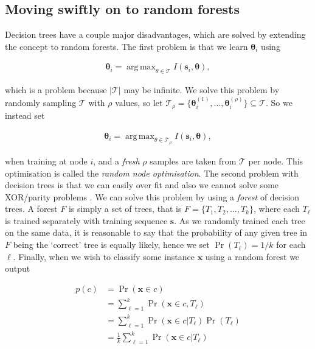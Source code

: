 \documentclass[12pt,twoside,notitlepage]{report}
\newcommand{\vc}[1]{\mathbf{#1}}
\newcommand{\cl}[1]{\mathcal{#1}}
\DeclareMathOperator*{\argmax}{arg\,max}
\begin{document}
        \subsection{Moving swiftly on to random forests}
            Decision trees have a couple major disadvantages, which are solved by extending the concept to random 
            forests. The first problem is that we learn $\vc{\theta}_i$ using

            \begin{align} 
                \vc{\theta}_i = \argmax_{\theta\in\cl{T}} I(\vc{s}_i, \vc{\theta}),
            \end{align}

            which is a problem because $|\cl{T}|$ may be infinite. We solve this problem by randomly sampling $\cl{T}$ with 
            $\rho$ values, so let $\cl{T}_\rho = \{ \vc{\theta}_i^{(1)}, ..., \vc{\theta}_i^{(\rho)} \} \subseteq \cl{T}$.
            So we instead set 

            \begin{align} 
                \vc{\theta}_i = \argmax_{\theta\in\cl{T}_\rho} I(\vc{s}_i, \vc{\theta}),
            \end{align}            

            when training at node $i$, and a \textit{fresh} $\rho$ samples are taken from $\cl{T}$ per node. This 
            optimisation is called the \textit{random node optimisation}. The second problem with decision trees is that 
            we can easily over fit and also we cannot solve some XOR/parity problems \cite{criminisi2013decision}. We 
            can solve this problem by using a \textit{forest} of decision trees. A forest $F$ is simply a set of trees, 
            that is $F = \{ T_1, T_2, ..., T_k \}$, where each $T_\ell$ is trained separately with training sequence 
            $\vc{s}$. As we randomly trained each tree on the same data, it is reasonable to say that the probability of 
            any given tree in $F$ being the `correct' tree is equally likely, hence we set $\Pr(T_\ell) = 1/k$ for each 
            $\ell$. Finally, when we wish to classify some instance $\vc{x}$ using a random forest we output 

            \begin{align}
                p(c) & = \Pr(\vc{x} \in c) \\
                    & = \sum_{\ell=1}^k \Pr(\vc{x} \in c, T_\ell) \\
                    & = \sum_{\ell=1}^k \Pr(\vc{x} \in c | T_\ell) \Pr(T_\ell) \\
                    & = \frac{1}{k} \sum_{\ell=1}^k \Pr(\vc{x} \in c | T_\ell)
            \end{align}
\end{document}
